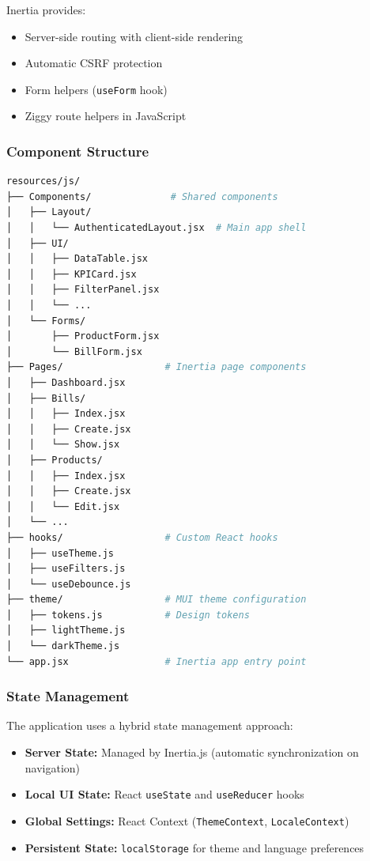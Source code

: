 Inertia provides:
\begin{itemize}
    \item Server-side routing with client-side rendering
    \item Automatic CSRF protection
    \item Form helpers (\texttt{useForm} hook)
    \item Ziggy route helpers in JavaScript
\end{itemize}

\subsubsection{Component Structure}

\begin{lstlisting}[language=bash,label=lst:frontend-structure,caption={React Frontend Structure}]
resources/js/
├── Components/              # Shared components
│   ├── Layout/
│   │   └── AuthenticatedLayout.jsx  # Main app shell
│   ├── UI/
│   │   ├── DataTable.jsx
│   │   ├── KPICard.jsx
│   │   ├── FilterPanel.jsx
│   │   └── ...
│   └── Forms/
│       ├── ProductForm.jsx
│       └── BillForm.jsx
├── Pages/                  # Inertia page components
│   ├── Dashboard.jsx
│   ├── Bills/
│   │   ├── Index.jsx
│   │   ├── Create.jsx
│   │   └── Show.jsx
│   ├── Products/
│   │   ├── Index.jsx
│   │   ├── Create.jsx
│   │   └── Edit.jsx
│   └── ...
├── hooks/                  # Custom React hooks
│   ├── useTheme.js
│   ├── useFilters.js
│   └── useDebounce.js
├── theme/                  # MUI theme configuration
│   ├── tokens.js           # Design tokens
│   ├── lightTheme.js
│   └── darkTheme.js
└── app.jsx                 # Inertia app entry point
\end{lstlisting}

\subsubsection{State Management}

The application uses a hybrid state management approach:

\begin{itemize}
    \item \textbf{Server State:} Managed by Inertia.js (automatic synchronization on navigation)
    \item \textbf{Local UI State:} React \texttt{useState} and \texttt{useReducer} hooks
    \item \textbf{Global Settings:} React Context (\texttt{ThemeContext}, \texttt{LocaleContext})
    \item \textbf{Persistent State:} \texttt{localStorage} for theme and language preferences
\end{itemize}

